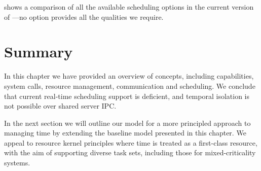  shows a comparison of all the available scheduling options in
the current version of \selfour---no option provides all the qualities we require.

\section{Summary}

In this chapter we have provided an overview of \selfour concepts, including capabilities, system
calls, resource management, communication and scheduling. We conclude that current real-time
scheduling support is deficient, and temporal isolation is not possible over shared server IPC.  

In the next section we will outline our model for a more principled approach to managing time by
extending the baseline \selfour model presented in this chapter. We appeal to resource kernel
principles where time is treated as a first-class resource, with the aim of supporting diverse task
sets, including those for mixed-criticality systems.
